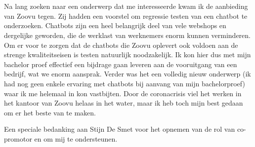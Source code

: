 
\chapter*{}
\label{ch:voorwoord}


Na lang zoeken naar een onderwerp dat me interesseerde kwam ik de aanbieding van Zoovu tegen. Zij hadden een voorstel om regressie testen van een chatbot te onderzoeken. Chatbots zijn een heel belangrijk deel van vele webshops en dergelijke geworden, die de werklast van werknemers enorm kunnen verminderen. Om er voor te zorgen dat de chatbots die Zoovu oplevert ook voldoen aan de strenge  kwaliteitseisen is testen natuurlijk noodzakelijk. Ik kon hier dus met mijn bachelor proef effectief een bijdrage gaan leveren aan de vooruitgang van een bedrijf, wat we enorm aansprak. Verder was het een volledig nieuw onderwerp (ik had nog geen enkele ervaring met chatbots bij aanvang van mijn bachelorproef) waar ik me helemaal in kon vastbijten. Door de coronacrisis viel het werken in het kantoor van Zoovu helaas in het water, maar ik heb toch mijn best gedaan om er het beste van te maken. 

Een speciale bedanking aan Stijn De Smet voor het opnemen van de rol van co-promotor en om mij te ondersteunen. 